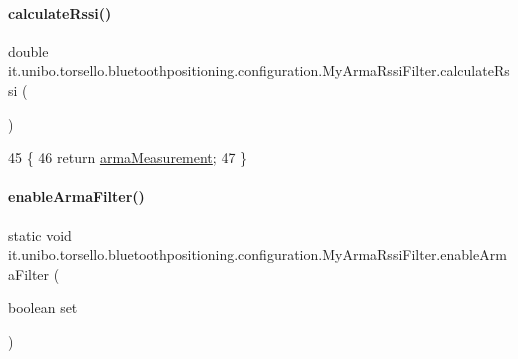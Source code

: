 \hypertarget{classit_1_1unibo_1_1torsello_1_1bluetoothpositioning_1_1configuration_1_1MyArmaRssiFilter_afcb40e796f16bc1352d34567e8984a87_afcb40e796f16bc1352d34567e8984a87}{}\label{classit_1_1unibo_1_1torsello_1_1bluetoothpositioning_1_1configuration_1_1MyArmaRssiFilter_afcb40e796f16bc1352d34567e8984a87_afcb40e796f16bc1352d34567e8984a87} 
\paragraph{\texorpdfstring{calculate\+Rssi()}{calculateRssi()}}
{\footnotesize\ttfamily double it.\+unibo.\+torsello.\+bluetoothpositioning.\+configuration.\+My\+Arma\+Rssi\+Filter.\+calculate\+Rssi (\begin{DoxyParamCaption}{ }\end{DoxyParamCaption})}


\begin{DoxyCode}
45                                   \{
46         \textcolor{keywordflow}{return} \hyperlink{classit_1_1unibo_1_1torsello_1_1bluetoothpositioning_1_1configuration_1_1MyArmaRssiFilter_a2be11d7395143321b8f2063afe14a8d0_a2be11d7395143321b8f2063afe14a8d0}{armaMeasurement};
47     \}
\end{DoxyCode}
\hypertarget{classit_1_1unibo_1_1torsello_1_1bluetoothpositioning_1_1configuration_1_1MyArmaRssiFilter_a0ce35b24ad6c6d9abe69e038b3e8da7d_a0ce35b24ad6c6d9abe69e038b3e8da7d}{}\label{classit_1_1unibo_1_1torsello_1_1bluetoothpositioning_1_1configuration_1_1MyArmaRssiFilter_a0ce35b24ad6c6d9abe69e038b3e8da7d_a0ce35b24ad6c6d9abe69e038b3e8da7d} 
\paragraph{\texorpdfstring{enable\+Arma\+Filter()}{enableArmaFilter()}}
{\footnotesize\ttfamily static void it.\+unibo.\+torsello.\+bluetoothpositioning.\+configuration.\+My\+Arma\+Rssi\+Filter.\+enable\+Arma\+Filter (\begin{DoxyParamCaption}\item[{boolean}]{set }\end{DoxyParamCaption})\hspace{0.3cm}{\ttfamily [static]}}


